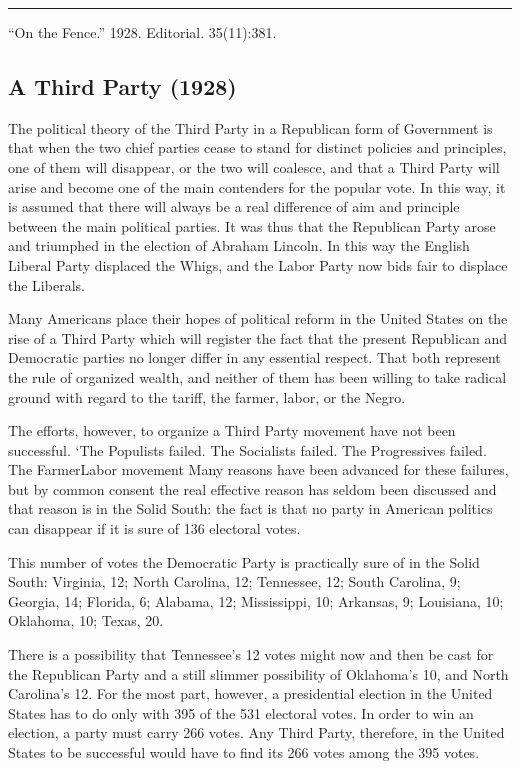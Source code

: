 \documentclass[letterpaper,10pt,english]{jupyterBook}
\begin{document}
\bigskip\hrule\bigskip


\sphinxAtStartPar
{} “On the Fence.” 1928. Editorial.  35(11):381.


\subsection{A Third Party (1928)}
\label{\detokenize{Volumes/35/11/third_party:a-third-party-1928}}\label{\detokenize{Volumes/35/11/third_party::doc}}
\sphinxAtStartPar
The political theory of the Third Party in a Republican form of Government is that when the two chief parties cease to stand for distinct policies and principles, one of them will disappear, or the two will coalesce, and that a Third Party will arise and become one of the main contenders for the popular vote. In this way, it is assumed that there will always be a real difference of aim and principle between the main political parties. It was thus that the Republican Party arose and triumphed in the election of Abraham Lincoln. In this way the English Liberal Party displaced the Whigs, and the Labor Party now bids fair to displace the Liberals.

\sphinxAtStartPar
Many Americans place their hopes of political reform in the United States on the rise of a Third Party which will register the fact that the present Republican and Democratic parties no longer differ in any essential respect. That both represent the rule of organized wealth, and neither of them has been willing to take radical ground with regard to the tariff, the farmer, labor, or the Negro.

\sphinxAtStartPar
The efforts, however, to organize a Third Party movement have not been successful. ‘The Populists failed. The Socialists failed. The Progressives failed. The Farmer\sphinxhyphen{}Labor movement Many reasons have been advanced for these failures, but by common consent the real effective reason has seldom been discussed and that reason is in the Solid South: the fact is that no party in American politics can disappear if it is sure of 136 electoral votes.

\sphinxAtStartPar
This number of votes the Democratic Party is practically sure of in the Solid South: Virginia, 12; North Carolina, 12; Tennessee, 12; South Carolina, 9; Georgia, 14; Florida, 6; Alabama, 12; Mississippi, 10; Arkansas, 9; Louisiana, 10; Oklahoma, 10; Texas, 20.

\sphinxAtStartPar
There is a possibility that Tennessee’s 12 votes might now and then be cast for the Republican Party and a still slimmer possibility of Oklahoma’s 10, and North Carolina’s 12. For the most part, however, a presidential election in the United States has to do only with 395 of the 531 electoral votes. In order to win an election, a party must carry 266 votes. Any Third Party, therefore, in the United States to be successful would have to find its 266 votes among the 395 votes.
\end{document}
